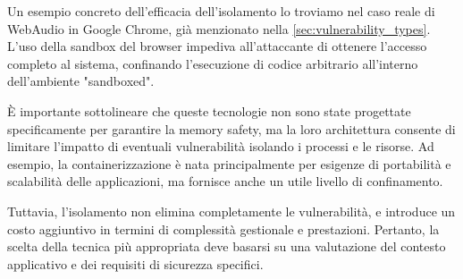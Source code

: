 Un esempio concreto dell'efficacia dell'isolamento lo troviamo nel caso reale di
WebAudio in Google Chrome, già menzionato nella
\autoref{sec:vulnerability_types}. L'uso della sandbox del browser impediva all'attaccante
di ottenere l'accesso completo al sistema, confinando l'esecuzione di codice
arbitrario all'interno dell'ambiente "sandboxed".\cite{webaudio_uaf}

È importante sottolineare che queste tecnologie non sono state progettate specificamente
per garantire la memory safety, ma la loro architettura consente di limitare l'impatto
di eventuali vulnerabilità isolando i processi e le risorse. Ad esempio, la
containerizzazione è nata principalmente per esigenze di portabilità e
scalabilità delle applicazioni, ma fornisce anche un utile livello di confinamento.

Tuttavia, l'isolamento non elimina completamente le vulnerabilità, e introduce un
costo aggiuntivo in termini di complessità gestionale e prestazioni. Pertanto, la
scelta della tecnica più appropriata deve basarsi su una valutazione del contesto
applicativo e dei requisiti di sicurezza specifici.